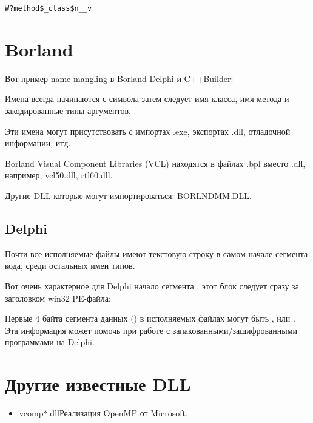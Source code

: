 \begin{lstlisting}
W?method$_class$n__v
\end{lstlisting}

\section{Borland}

Вот пример \gls{name mangling} в Borland Delphi и C++Builder:



Имена всегда начинаются с символа  
затем следует имя класса, имя метода
и закодированные типы аргументов.

Эти имена могут присутствовать с импортах .exe, экспортах .dll, отладочной информации, итд.

Borland Visual Component Libraries (VCL) находятся в файлах .bpl вместо .dll, например, vcl50.dll, rtl60.dll.

Другие DLL которые могут импортироваться: BORLNDMM.DLL.

\subsection{Delphi}

Почти все исполняемые файлы имеют текстовую строку  
в самом начале сегмента кода, среди остальных имен типов.

Вот очень характерное для Delphi начало сегмента , 
этот блок следует сразу за заголовком win32 PE-файла:



Первые 4 байта сегмента данных () в исполняемых файлах могут быть ,  или .
Эта информация может помочь при работе с запакованными/зашифрованными программами на Delphi.

\section{Другие известные DLL}

\begin{itemize}
\item vcomp*.dll\EMDASH{}Реализация OpenMP от Microsoft.
\end{itemize}


